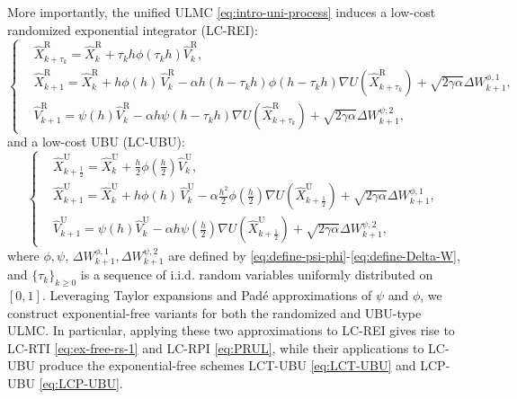\documentclass[12pt]{article}
\numberwithin{equation}{section}
\begin{document}
More importantly, the unified ULMC \eqref{eq:intro-uni-process} induces a low-cost randomized exponential integrator (LC-REI):
\begin{equation}\label{eq:intro-LC-REI}
\left\{
\begin{aligned}
&
\widehat{X}^{\mathrm{R}}_{k+\tau_k} 
=  
\widehat{X}^{\mathrm{R}}_k 
+ 
\tau_k h\phi(\tau_kh)\widehat{V}^{\mathrm{R}}_k,
\\
&
\widehat{X}^{\mathrm{R}}_{k+1} 
=  
\widehat{X}^{\mathrm{R}}_k + h\phi (h)\, \widehat{V}^{\mathrm{R}}_k -
\alpha h
(h-\tau_k h) 
\phi (h-\tau_k h) \nabla U(\widehat{X}^{\mathrm{R}}_{k+\tau_k}) 
+ 
\sqrt{2\gamma\alpha} 
\Delta W_{k+1}^{\phi,1},
\\
&\widehat{V}^{\mathrm{R}}_{k+1} =   \psi(h) \widehat{V}^{\mathrm{R}}_k -\alpha h \psi(h-\tau_k h ) \nabla U (\widehat{X}^{\mathrm{R}}_{k+\tau_k}) +
\sqrt{2\gamma\alpha} 
\Delta W_{k+1}^{\psi,2},
\end{aligned}
\right.
\end{equation}
and a low-cost UBU (LC-UBU):
\begin{equation}\label{eq:intro-LC-UBU}
\left\{
\begin{aligned}
&
\widehat{X}^{\mathrm{U}}_{k+\frac12} 
=  
\widehat{X}^{\mathrm{U}}_k 
+ 
\tfrac h 2 \phi(\tfrac h 2) \widehat {V}^{\mathrm{U}}_k,
\\
&
\widehat{X}^{\mathrm{U}}_{k+1} 
=  
\widehat{X}^{\mathrm{U}}_k + h\phi (h)\, \widehat{V}^{\mathrm{U}}_k -
\alpha \tfrac {h^2} {2} 
\phi ( \tfrac{h}{2} ) \nabla U(\widehat {X}^{\mathrm{U}}_{k+\frac12}) 
+ 
\sqrt{2\gamma\alpha} 
\Delta W_{k+1}^{\phi,1},
\\
&\widehat {V}^{\mathrm{U}}_{k+1} =   \psi(h) \widehat {V}^{\mathrm{U}}_k -\alpha h \psi( \tfrac{h}{2} ) \nabla U (\widehat { X }^{\mathrm{U}}_{k+\frac12}) +
\sqrt{2\gamma\alpha} 
\Delta W_{k+1}^{\psi,2},
\end{aligned}
\right.
\end{equation}
where $\phi, \psi$, $\Delta W_{k+1}^{\phi,1}, \Delta W_{k+1}^{\psi,2}$ are defined by \eqref{eq:define-psi-phi}-\eqref{eq:define-Delta-W}, and $\{\tau_k\}_{k\geq 0}$ is a sequence of i.i.d. random
variables uniformly distributed on $[0,1]$.
%
Leveraging Taylor expansions and Pad\'e approximations of $\psi$ and $\phi$, we construct exponential-free variants for both the randomized and UBU-type ULMC. In particular, applying these two approximations to LC-REI gives rise to LC-RTI \eqref{eq:ex-free-rs-1} and LC-RPI \eqref{eq:PRUL}, while their applications to LC-UBU produce the exponential-free schemes LCT-UBU \eqref{eq:LCT-UBU} and LCP-UBU \eqref{eq:LCP-UBU}.
\end{document}
